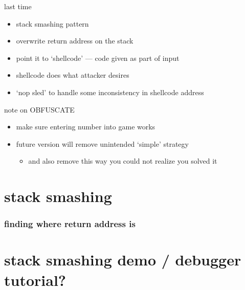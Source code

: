 \date{}
\title{}
\date{}

\begin{frame}
    \titlepage
\end{frame}



\begin{frame}{last time}
    \begin{itemize}
    \item stack smashing pattern
    \item overwrite return address on the stack
    \item point it to `shellcode' --- code given as part of input
    \item shellcode does what attacker desires
    \vspace{.5cm}
    \item `nop sled' to handle some inconsistency in shellcode address
    \end{itemize}
\end{frame}

\begin{frame}{note on OBFUSCATE}
    \begin{itemize}
    \item make sure entering number into game works
    \item future version will remove unintended `simple' strategy
        \begin{itemize}
        \item and also remove this way you could not realize you solved it
        \end{itemize}
    \end{itemize}
\end{frame}

\section{stack smashing}


\subsubsection{finding where return address is}


\section{stack smashing demo / debugger tutorial?}


